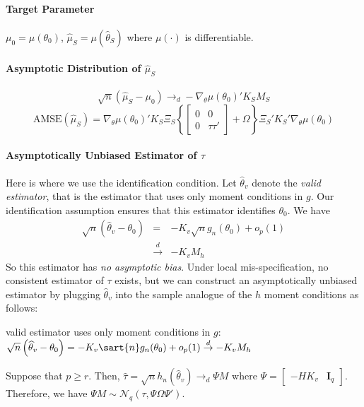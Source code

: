 \documentclass[12pt]{article}
\theoremstyle{definition}
\begin{document}
\paragraph{Target Parameter} $\mu_0 = \mu(\theta_0)$, $\widehat{\mu}_S = \mu(\widehat{\theta}_S)$ where $\mu(\cdot)$ is differentiable.

\paragraph{Asymptotic Distribution of $\widehat{\mu}_S$} 
$$\sqrt{n}\left(\widehat{\mu}_S - \mu_0\right)\rightarrow_d-\nabla_\theta\mu(\theta_0)'K_S M_S$$
$$\mbox{AMSE}\left(\widehat{\mu}_S\right) = \nabla_\theta\mu(\theta_0)'K_S \Xi_S \left\{\left[\begin{array}{cc}0&0\\0&\tau\tau'\end{array}\right] + \Omega\right\}\Xi_S'K_S'\nabla_\theta\mu(\theta_0)$$

\paragraph{Asymptotically Unbiased Estimator of $\tau$} Here is where we use the identification condition. Let $\widehat{\theta}_v$ denote the \emph{valid estimator}, that is the estimator that uses only moment conditions in $g$. Our identification assumption ensures that this estimator identifies $\theta_0$. We have
\begin{eqnarray*}
	\sqrt{n}\left(\widehat{\theta}_v - \theta_0 \right) &=&  -K_v \sqrt{n}g_n(\theta_0) + o_p(1)\\
	&\overset{d}{\rightarrow}& -K_v M_h
\end{eqnarray*}
So this estimator has \emph{no asymptotic bias}. Under local mis-specification, no consistent estimator of $\tau$ exists, but we can construct an asymptotically unbiased estimator by plugging $\widehat{\theta}_v$ into the sample analogue of the $h$ moment conditions as follows:


valid estimator uses only moment conditions in $g$: $\sqrt{n}\left(\widehat{\theta}_v - \theta_0 \right) =  -K_v \sart{n}g_n(\theta_0) + o_p(1) \overset{d}{\rightarrow} -K_v M_h$

Suppose that $p\geq r$. Then, $\widehat{\tau} = \sqrt{n} h_n(\widehat{\theta}_v) \rightarrow_d\Psi M$ where $\Psi = \left[\begin{array}{cc} -HK_v & \mathbf{I}_q \end{array}\right]$. Therefore, we have $\Psi M \sim \mathcal{N}_q(\tau, \Psi \Omega \Psi')$.
\end{document}
